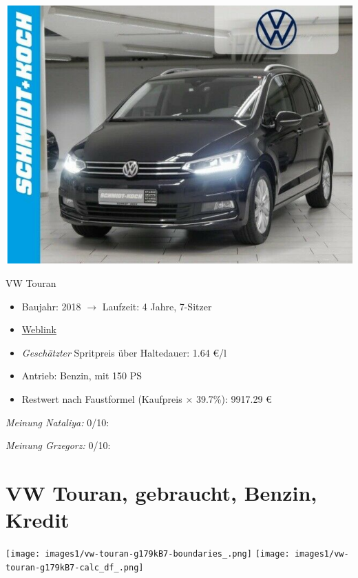 \documentclass[landscape, DIV=99, 14pt]{scrartcl}
\begin{document}
\pagebreak
\begin{center}
\includegraphics[width=0.9\columnwidth]{cars/vw-touran-geb.png}

VW Touran
\end{center}

\begin{itemize}
    \item Baujahr: 2018 $\rightarrow$ Laufzeit: 4 Jahre, 7-Sitzer
    \item \href{https://suchen.mobile.de/fahrzeuge/details.html?id=338082714}{Weblink}
    \item \emph{Gesch\"atzter} Spritpreis \"uber Haltedauer: 1.64 \euro{}/l
    \item Antrieb: Benzin, mit 150 PS
    \item Restwert nach Faustformel (Kaufpreis $\times$ 39.7\%): 9917.29 \euro{}
\end{itemize}

\begin{small}
\emph{Meinung Nataliya:} 0/10: 
        
\emph{Meinung Grzegorz:} 0/10: 
\end{small}

\pagebreak


\twocolumn

\section*{VW Touran, gebraucht, Benzin, Kredit}
\begin{center}
\texttt{[image: images1/vw-touran-g179kB7-boundaries\_.png]}
\null
\vspace{0.5cm}
\texttt{[image: images1/vw-touran-g179kB7-calc\_df\_.png]}
\end{center}
\end{document}
